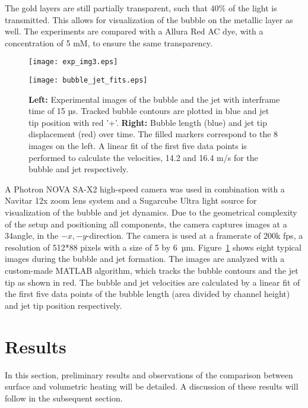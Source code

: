 \documentclass[11pt]{article}
\begin{document}
The gold layers are still partially transparent, such that 40\% of the light is transmitted. This allows for visualization of the bubble on the metallic layer as well. The experiments are compared with a Allura Red AC dye, with a concentration of 5 mM, to ensure the same transparency.

\begin{figure}[b!]
	\begin{minipage}[b]{0.5\linewidth}
		
		\centering
		\texttt{[image: exp\_img3.eps]}
	\end{minipage}
	\begin{minipage}[b]{0.5\linewidth}
		\centering
		\texttt{[image: bubble\_jet\_fits.eps]}
		\caption{\textbf{Left:} Experimental images of the bubble and the jet with interframe time of 15 µs. Tracked bubble contours are plotted in blue and jet tip position with red '+'. \textbf{Right:} Bubble length (blue) and jet tip displacement (red) over time. The filled markers correspond to the 8 images on the left. A linear fit of the first five data points is performed to calculate the velocities, 14.2 and 16.4 m/s for the bubble and jet respectively. }
		\label{C4: fig: exp images and fits}
	\end{minipage}
\end{figure}

A Photron NOVA SA-X2 high-speed camera was used in combination with a Navitar 12x zoom lens system and a Sugarcube Ultra light source for visualization of the bubble and jet dynamics. Due to the geometrical complexity of the setup and positioning all components, the camera captures images at a 34\textdegree angle, in the $-x,-y$-direction. The camera is used at a framerate of 200k fps, a resolution of 512*88 pixels with a size of 5 by 6~µm. Figure~\ref{C4: fig: exp images and fits} shows eight typical images during the bubble and jet formation. The images are analyzed with a custom-made MATLAB algorithm, which tracks the bubble contours and the jet tip as shown in red. The bubble and jet velocities are calculated by a linear fit of the first five data points of the bubble length (area divided by channel height) and jet tip position respectively.

\section{Results}\label{C4: sec: results} 
In this section, preliminary results and observations of the comparison between surface and volumetric heating will be detailed. A discussion of these results will follow in the subsequent section. 
\end{document}
